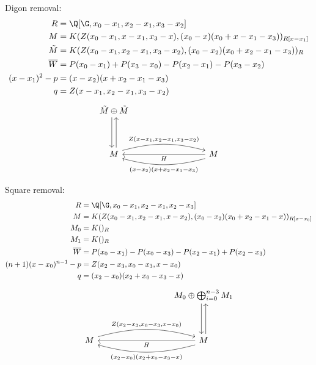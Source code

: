 Digon removal:\\
        \begin{align*}
            R&= \Q[\G, x_0-x_1,x_2-x_1,x_3-x_2] \\
            M &= K(Z(x_0-x_1,x-x_1,x_3-x),(x_0-x)(x_0+x-x_1-x_3))_{R[x-x_1]}\\
            \tilde M &= K(Z(x_0-x_1,x_2-x_1,x_3-x_2),(x_0-x_2)(x_0+x_2-x_1-x_3))_{R}\\
            \overline{W} &= P(x_0-x_1)+P(x_3-x_0)-P(x_2-x_1)-P(x_3-x_2) \\
            (x-x_1)^{2}-p &=  (x-x_2)(x+x_2-x_1-x_3)\\
            q &= Z(x-x_1,x_2-x_1,x_3-x_2)
        \end{align*}
       $$\begin{tikzcd}[column sep=3cm]
        \tilde M\oplus \tilde M\ar[dd, shift right=0.6ex, swap]\ar[dd, leftarrow, shift left=0.6ex]&\\\\
            M\ar[r, "{Z(x-x_1, x_2-x_1,x_3-x_2)}", shift left=0.5ex, bend left=15]& M\ar[l, "H"]\ar[l, "(x-x_2)(x+x_2-x_1-x_3)", shift left=0.5ex, bend left=15]
        \end{tikzcd}$$

Square removal:
        \begin{align*}
            R&= \Q[\G, x_0-x_1,x_2-x_1,x_2-x_3] \\
            M &= K(Z(x_0-x_1,x_2-x_1,x-x_2),(x_0-x_2)(x_0+x_2-x_1-x))_{R[x-x_0]}\\
            M_0 &= K()_{R}\\
            M_1 &= K()_{R}\\
            \overline{W} &= P(x_0-x_1)-P(x_0-x_3)-P(x_2-x_1)+P(x_2-x_3) \\
            (n+1)(x-x_0)^{n-1}-p &=  Z(x_2-x_3,x_0-x_3,x-x_0)\\
            q &= (x_2-x_0)(x_2+x_0-x_3-x)
        \end{align*}
       $$\begin{tikzcd}[column sep=3cm]
        &M_0\oplus \bigoplus_{i=0}^{n-3} M_1\ar[dd, shift right=0.6ex, swap]\ar[dd, leftarrow, shift left=0.6ex]\\\\
            M\ar[r, "{Z(x_2-x_3,x_0-x_3,x-x_0)}", shift left=0.5ex, bend left=15]& M\ar[l, "H"]\ar[l, "(x_2-x_0)(x_2+x_0-x_3-x)", shift left=0.5ex, bend left=15]
        \end{tikzcd}$$

